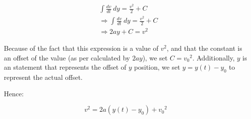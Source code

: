 \documentclass[letterpaper]{article}
\begin{document}
\begin{align}
    & \int \frac{dv}{dt}\ dy = \frac{v^2}{2} + C \\
    & \Rightarrow \int \frac{dv}{dt}\ dy = \frac{v^2}{2} + C\\
    & \Rightarrow 2ay + C = v^2 
\end{align}

Because of the fact that this expression is a value of \(v^2\), and that the constant is an offset of the value (as per calculated by \(2ay\)), we set \(C = {v_0}^2\). Additionally, \(y\) is an statement that represents the offset of \(y\) position, we set \(y = y(t)-y_0\) to represent the actual offset.

Hence:

\begin{equation}
    v^2 = 2a(y(t)-y_0) + {v_0}^2
\end{equation}
\end{document}
